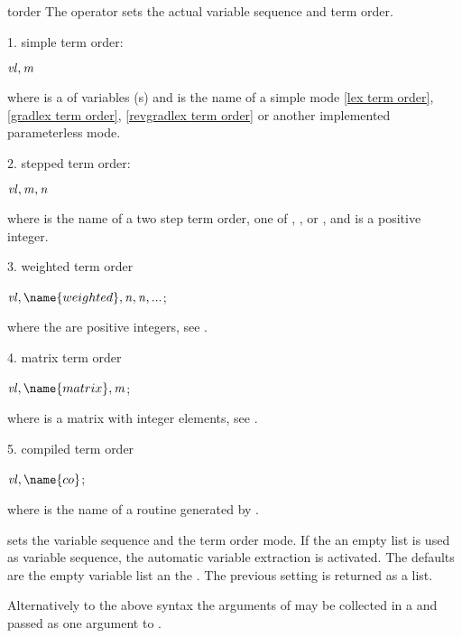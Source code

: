 \begin{Operator}{torder}
The operator  sets the actual variable sequence and term order.

1. simple term order:
\begin{Syntax}
  \(\meta{vl}, \meta{m}\)
\end{Syntax}

where   is a  of variables (s) and
 is the name of a simple  mode 
\ref{lex term order}, \ref{gradlex term order}, 
\ref{revgradlex term order} or another implemented parameterless mode.

2. stepped term order:
\begin{Syntax}
  
   \(\meta{vl},\meta{m},\meta{n}\)

\end{Syntax}
  
where  is the name of a two step term order, one of
, ,
 or , and
 is a positive integer.

3. weighted term order
\begin{Syntax}
  \(\meta{vl}, \name{weighted}, \meta{n},\meta{n},...\); 
\end{Syntax}

where the  are positive integers, see .

4. matrix term order
\begin{Syntax}
  \(\meta{vl}, \name{matrix}, \meta{m}\); 
\end{Syntax}

where  is a matrix with integer elements, see 
.

5. compiled term order
\begin{Syntax}
  \(\meta{vl}, \name{co}\); 
\end{Syntax}

where  is the name of a routine generated by 
.

 sets the variable sequence and the term order mode. If the
an empty list is used as variable sequence, the automatic variable extraction
is activated. The defaults are the empty variable list an the 
. 
The previous setting is returned as a list. 

Alternatively to the above syntax the arguments of  may be 
collected in a  and passed as one argument to 
.

\end{Operator}
